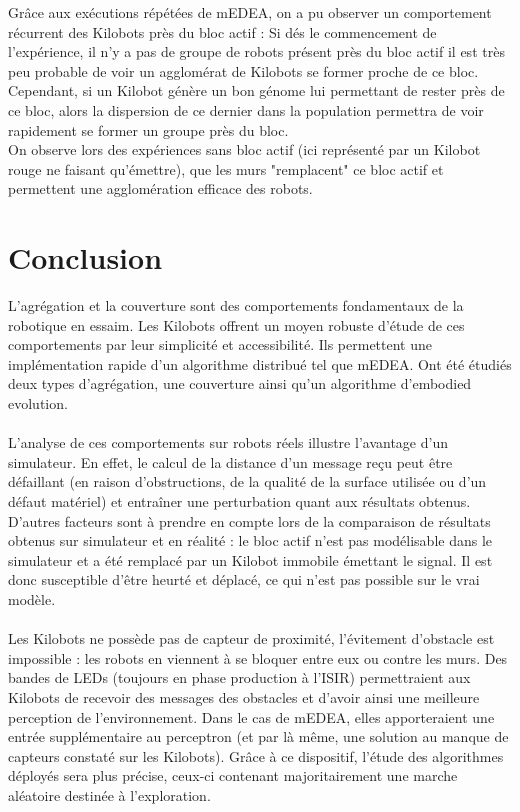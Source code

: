 \documentclass[a4paper]{article}
\begin{document}
Grâce aux exécutions répétées de mEDEA, on a pu observer un comportement récurrent des Kilobots près du bloc actif : Si dés le commencement de l'expérience, il n'y a pas de groupe de robots présent près du bloc actif  il est très peu probable de voir un agglomérat de Kilobots se former proche de ce bloc. Cependant, si un Kilobot génère un bon génome lui permettant de rester près de ce bloc, alors la dispersion de ce dernier dans la population permettra de voir rapidement se former un groupe près du bloc.\\
On observe lors des expériences sans bloc actif (ici représenté par un Kilobot rouge ne faisant qu'émettre), que les murs "remplacent" ce bloc actif et permettent une agglomération efficace des robots.
\newpage
\section{Conclusion}
L’agrégation et la couverture sont des comportements fondamentaux de la robotique en essaim. Les Kilobots offrent un moyen robuste d’étude de ces comportements par leur simplicité et accessibilité. Ils permettent une implémentation rapide d’un algorithme distribué tel que mEDEA. Ont été étudiés deux types d’agrégation, une couverture ainsi qu’un algorithme d’embodied evolution.
\\ \\%
L’analyse de ces comportements sur robots réels illustre l’avantage d’un simulateur. En effet, le calcul de la distance d’un message reçu peut être défaillant (en raison d’obstructions, de la qualité de la surface utilisée ou d’un défaut matériel) et entraîner une perturbation quant aux résultats obtenus. D’autres facteurs sont à prendre en compte lors de la comparaison de résultats obtenus sur simulateur et en réalité : le bloc actif n’est pas modélisable dans le simulateur et a été remplacé par un Kilobot immobile émettant le signal. Il est donc susceptible d’être heurté et déplacé, ce qui n’est pas possible sur le vrai modèle.
\\ \\
Les Kilobots ne possède pas de capteur de proximité, l’évitement d’obstacle est impossible : les robots en viennent à se bloquer entre eux ou contre les murs. Des bandes de LEDs (toujours en phase production à l’ISIR) permettraient aux Kilobots de recevoir des messages des obstacles et d'avoir ainsi une meilleure perception de l’environnement. Dans le cas de mEDEA, elles apporteraient une entrée supplémentaire au perceptron (et par là même, une solution au manque de capteurs constaté sur les Kilobots). Grâce à ce dispositif, l’étude des algorithmes déployés sera plus précise, ceux-ci contenant majoritairement une marche aléatoire destinée à l’exploration. 
\end{document}
